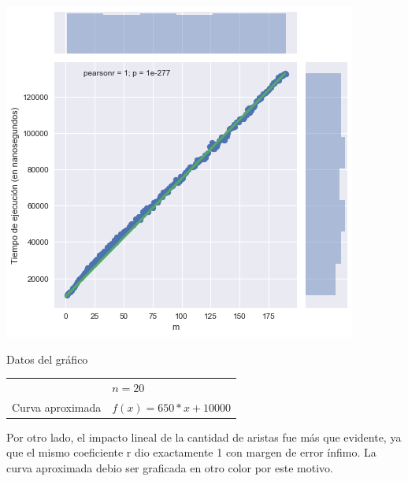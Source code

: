 \noindent
\begin{minipage}{0.55\textwidth}
    \hfill
    \includegraphics[scale=0.6]{img/greedy-m.png}
\end{minipage}
\hfill
\begin{minipage}{0.44\textwidth}
    \begin{center}
        Datos del gráfico

        \begin{tabular}{ | l l |}
            \hline
             & $n = 20$\\ 
            Curva aproximada & $f(x) = 650 * x + 10000$ \\
            \hline
        \end{tabular}
    \end{center}
\end{minipage}

Por otro lado, el impacto lineal de la cantidad de aristas fue más que evidente, ya que el mismo coeficiente r dio exactamente 1 con margen de error ínfimo. La curva aproximada debio ser graficada en otro color por este motivo.

